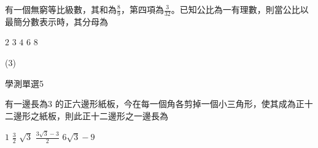 \begin{QUESTIONS}
\begin{QUESTION}
\begin{ExamAnsRateInfo}{}{}{}{}
        \end{ExamAnsRateInfo}
        \begin{QBODY}
            有一個無窮等比級數，其和為$\frac{8}{9}$，第四項為$\frac{3}{32}$。已知公比為一有理數，則當公比以最簡分數表示時，其分母為
            \begin{QOPS}
                \QOP $2$	
                \QOP $3$
                \QOP $4$	
                \QOP $6$
                \QOP $8$
            \end{QOPS}
        \end{QBODY}
        \begin{QFROMS}
        \end{QFROMS}
        \begin{QTAGS}\end{QTAGS}
        \begin{QANS}
            (3)
        \end{QANS}
        \begin{QSOLLIST}
        \end{QSOLLIST}
        \begin{QEMPTYSPACE}
        \end{QEMPTYSPACE}
    \end{QUESTION}
    \begin{QUESTION}
        \begin{ExamInfo}{86}{學測}{單選}{5}
        \end{ExamInfo}
        \begin{ExamAnsRateInfo}{}{}{}{}
        \end{ExamAnsRateInfo}
        \begin{QBODY}
            有一邊長為$3$ 的正六邊形紙板，今在每一個角各剪掉一個小三角形，使其成為正十二邊形之紙板，則此正十二邊形之一邊長為
            \begin{QOPS}
                \QOP $1$	
                \QOP $\frac{3}{2}$
                \QOP $\sqrt{3}$	
                \QOP $\frac{3\sqrt{3}-3}{2}$
                \QOP $6\sqrt{3}-9$
            \end{QOPS}
            

\end{QBODY}
\end{QUESTION}
\end{QUESTIONS}

